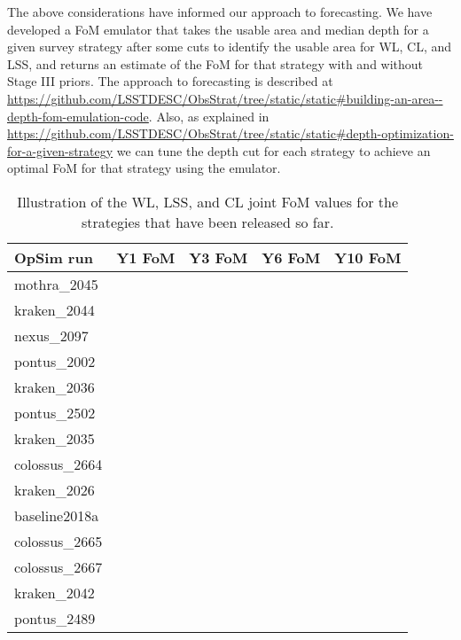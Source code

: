 The above considerations have informed our approach to forecasting.  We have developed a FoM
emulator that takes the usable area and median depth for a given survey strategy after some cuts to
identify the usable area for 
WL, CL, and LSS, and returns an estimate of the FoM for that strategy with and without Stage III
priors.  The approach to forecasting is described at
\url{https://github.com/LSSTDESC/ObsStrat/tree/static/static#building-an-area--depth-fom-emulation-code}.
Also, as explained in
\url{https://github.com/LSSTDESC/ObsStrat/tree/static/static#depth-optimization-for-a-given-strategy}
we can tune the depth cut for each strategy to achieve an optimal FoM for that strategy using the emulator.

\begin{table}[ht]
\caption{Illustration of the WL, LSS, and CL joint FoM values for the strategies that have been
  released so far.  }
\begin{tabular}{lllll}
\label{table:staticfom}
OpSim run & Y1 FoM & Y3 FoM & Y6 FoM & Y10 FoM \\ \hline
mothra\_2045   &  & & & \\
kraken\_2044   &  & & & \\
nexus\_2097    &  & & & \\
pontus\_2002   &  & & & \\
kraken\_2036   &  & & & \\
pontus\_2502   &  & & & \\
kraken\_2035   &  & & & \\
colossus\_2664 &  & & & \\
kraken\_2026   &  & & & \\
baseline2018a  &  & & & \\
colossus\_2665 &  & & & \\
colossus\_2667 &  & & & \\
kraken\_2042   &  & & & \\
pontus\_2489   &  & & & \\
\end{tabular}
\end{table}



